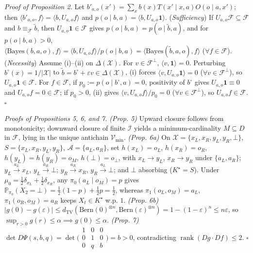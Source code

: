 \documentclass[12pt,letterpaper]{article}
\begin{document}
\emph{Proof of Proposition 2.} Let
\(b'_{a,o}(x') = \sum_{x} b(x) T(x'\mid x,a) O(o\mid a,x')\); then
\(\langle b'_{a,o}, f\rangle = \langle b, U_{a,o}f\rangle\) and
\(p(o\mid b,a) = \langle b, U_{a,o}\mathbf{1}\rangle\).
(\emph{Sufficiency}) If \(U_{a,o}\mathcal{F} \subseteq \mathcal{F}\) and
\(b \equiv_{\mathcal{F}} \tilde{b}\), then
\(U_{a,o}\mathbf{1} \in \mathcal{F}\) gives
\(p(o\mid b,a) = p(o\mid \tilde{b},a)\), and for \(p(o\mid b,a) > 0\),
\(\langle \mathrm{Bayes}(b,a,o), f\rangle = \langle b, U_{a,o}f\rangle / p(o\mid b,a) = \langle \mathrm{Bayes}(\tilde{b},a,o), f\rangle\)
(\(\forall f \in \mathcal{F}\)). (\emph{Necessity}) Assume (i)--(ii) on
\(\Delta(\mathcal{X})\). For \(v \in \mathcal{F}^\perp\),
\(\langle v, \mathbf{1}\rangle = 0\). Perturbing
\(b^\circ(x) = 1/|\mathcal{X}|\) to
\(\tilde{b} = b^\circ + \varepsilon v \in \Delta(\mathcal{X})\), (i)
forces \(\langle v, U_{a,o}\mathbf{1}\rangle = 0\)
(\(\forall v \in \mathcal{F}^\perp\)), so
\(U_{a,o}\mathbf{1} \in \mathcal{F}\). For \(f \in \mathcal{F}\), if
\(p_0 := p(o\mid b^\circ, a) = 0\), positivity of \(b^\circ\) gives
\(U_{a,o}\mathbf{1} \equiv 0\) and \(U_{a,o}f = 0 \in \mathcal{F}\); if
\(p_0 > 0\), (ii) gives \(\langle v, U_{a,o}f\rangle / p_0 = 0\)
(\(\forall v \in \mathcal{F}^\perp\)), so \(U_{a,o}f \in \mathcal{F}\).
\(\square\)

\emph{Proofs of Propositions 5, 6, and 7.} \emph{(Prop. 5)} Upward
closure follows from monotonicity; downward closure of finite
\(\mathcal{I}\) yields a minimum-cardinality \(M \subseteq D\) in
\(\mathcal{F}\), lying in the unique antichain \(\mathcal{V}_{\min}\).
\emph{(Prop. 6a)} On \(\mathcal{X} = \{x_L, x_R, y_L, y_R, \bot\}\),
\(S = \{x_L, x_R, y_L, y_R\}\), \(\mathcal{A} = \{a_L, a_R\}\), set
\(h(x_L)=o_L\), \(h(x_R)=o_R\), \(h(y_L)=h(y_R)=o_M\),
\(h(\bot)=o_\bot\), with \(x_L \to y_L\), \(x_R \to y_R\) under
\(\{a_L,a_R\}\); \(y_L \xrightarrow{a_L} x_L\),
\(y_L \xrightarrow{a_R} \bot\); \(y_R \xrightarrow{a_R} x_R\),
\(y_R \xrightarrow{a_L} \bot\); and \(\bot\) absorbing
(\(K^\star = S\)). Under
\(\mu_0 = \frac{1}{2}\delta_{x_L} + \frac{1}{2}\delta_{x_R}\), any
\(\pi_0(a_L \mid o_M) = p\) gives
\(\mathbb{P}_{\pi_0}(X_2 = \bot) = \frac{1}{2}(1-p) + \frac{1}{2}p = \frac{1}{2}\),
whereas \(\pi_1(o_L,o_M)=a_L\), \(\pi_1(o_R,o_M)=a_R\) keeps
\(X_t \in K^\star\) w.p. \(1\). \emph{(Prop. 6b)}
\(|g(0) - g(\varepsilon)| \le d_{\mathrm{TV}}(\mathrm{Bern}(0)^{\otimes n}, \mathrm{Bern}(\varepsilon)^{\otimes n}) = 1 - (1-\varepsilon)^n \le n\varepsilon\),
so \(\sup_{r>0} g(r) \le \alpha \implies g(0) \le \alpha\). \emph{(Prop.
7)}
\(\det D\Psi(s,b,q) = \det \bigl(\begin{smallmatrix}1&0&0\\0&1&0\\0&q&b\end{smallmatrix}\bigr) = b > 0\),
contradicting \(\operatorname{rank}(Dg \cdot Df) \le 2\). \(\square\)
\end{document}
